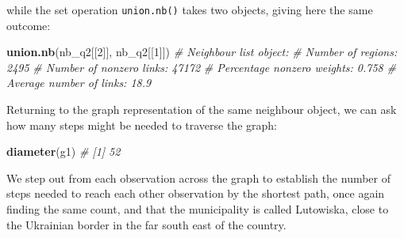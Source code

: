 \documentclass[]{book}
\newenvironment{Shaded}{\begin{snugshade}}{\end{snugshade}}
\newcommand{\CommentTok}[1]{\textcolor[rgb]{0.56,0.35,0.01}{\textit{#1}}}
\newcommand{\DecValTok}[1]{\textcolor[rgb]{0.00,0.00,0.81}{#1}}
\newcommand{\KeywordTok}[1]{\textcolor[rgb]{0.13,0.29,0.53}{\textbf{#1}}}
\newcommand{\NormalTok}[1]{#1}
\newcommand{\OperatorTok}[1]{\textcolor[rgb]{0.81,0.36,0.00}{\textbf{#1}}}
\newcommand{\StringTok}[1]{\textcolor[rgb]{0.31,0.60,0.02}{#1}}
\begin{document}
while the set operation \texttt{union.nb()} takes two objects, giving here the same outcome:

\begin{Shaded}
\begin{Highlighting}[]
\KeywordTok{union.nb}\NormalTok{(nb_q2[[}\DecValTok{2}\NormalTok{]], nb_q2[[}\DecValTok{1}\NormalTok{]])}
\CommentTok{# Neighbour list object:}
\CommentTok{# Number of regions: 2495 }
\CommentTok{# Number of nonzero links: 47172 }
\CommentTok{# Percentage nonzero weights: 0.758 }
\CommentTok{# Average number of links: 18.9}
\end{Highlighting}
\end{Shaded}

Returning to the graph representation of the same neighbour object, we can ask how many steps might be needed to traverse the graph:

\begin{Shaded}
\begin{Highlighting}[]
\KeywordTok{diameter}\NormalTok{(g1)}
\CommentTok{# [1] 52}
\end{Highlighting}
\end{Shaded}

We step out from each observation across the graph to establish the number of steps needed to reach each other observation by the shortest path, once again finding the same count, and that the municipality is called Lutowiska, close to the Ukrainian border in the far south east of the country.

\begin{Shaded}
\end{Shaded}

\begin{Shaded}
\end{Shaded}
\end{document}
